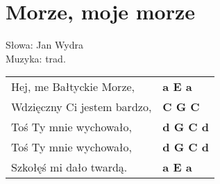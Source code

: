 \section{Morze, moje morze}


Słowa: Jan Wydra\\
Muzyka:  trad.

\vspace{2em}
\begin{tabular}{@{}p{5cm}@{}l@{}}
Hej, me Bałtyckie Morze, & \bfseries a E a \\
Wdzięczny Ci jestem bardzo, & \bfseries C G C \\
Toś Ty mnie wychowało, & \bfseries  d G C d \\
Toś Ty mnie wychowało, & \bfseries d G C d \\
Szkołęś mi dało twardą. & \bfseries  a E a \\
\end{tabular}

